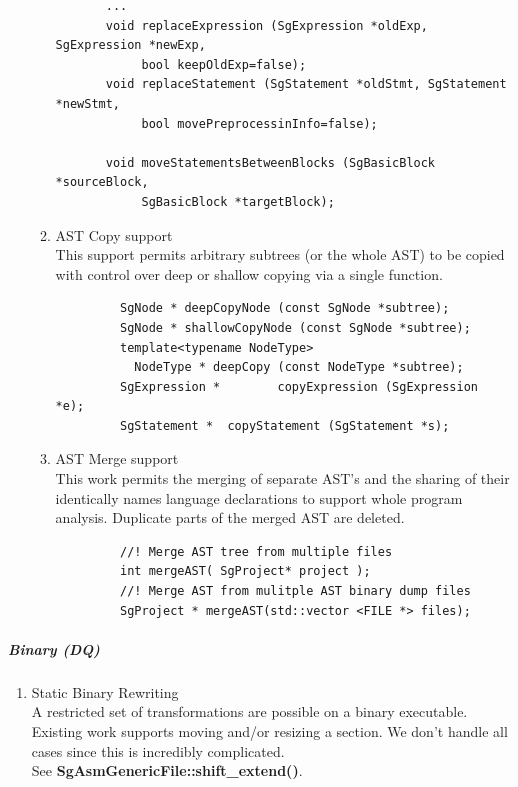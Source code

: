 \begin{enumerate}
\begin{enumerate}
\begin{lstlisting}
       ...
       void replaceExpression (SgExpression *oldExp, SgExpression *newExp, 
            bool keepOldExp=false);
       void replaceStatement (SgStatement *oldStmt, SgStatement *newStmt, 
            bool movePreprocessinInfo=false);
       
       void moveStatementsBetweenBlocks (SgBasicBlock *sourceBlock, 
            SgBasicBlock *targetBlock);
       \end{lstlisting}
       \item AST Copy support \\
         This support permits arbitrary subtrees (or the whole AST) to be copied
         with control over deep or shallow copying via a single function.
         \begin{lstlisting}
         SgNode * deepCopyNode (const SgNode *subtree);
         SgNode * shallowCopyNode (const SgNode *subtree);
         template<typename NodeType>
           NodeType * deepCopy (const NodeType *subtree);
         SgExpression *        copyExpression (SgExpression *e);
         SgStatement *  copyStatement (SgStatement *s);
         \end{lstlisting}

       \item AST Merge support \\
           This work permits the merging of separate AST's and the sharing of their
           identically names language declarations to support whole program
           analysis. Duplicate parts of the merged AST are deleted.
         \begin{lstlisting}
         //! Merge AST tree from multiple files
         int mergeAST( SgProject* project );
         //! Merge AST from mulitple AST binary dump files
         SgProject * mergeAST(std::vector <FILE *> files);
         \end{lstlisting}


       \end{enumerate} %
   \end{enumerate}  %

\subparagraph{Binary (DQ)}
\begin{enumerate}
   \item Static Binary Rewriting \\
         A restricted set of transformations are possible on a binary executable.
         Existing work supports moving and/or resizing a section. We don't handle 
         all cases since this is incredibly complicated. \\
         See {\bf SgAsmGenericFile::shift\_extend()}.
\end{enumerate}

